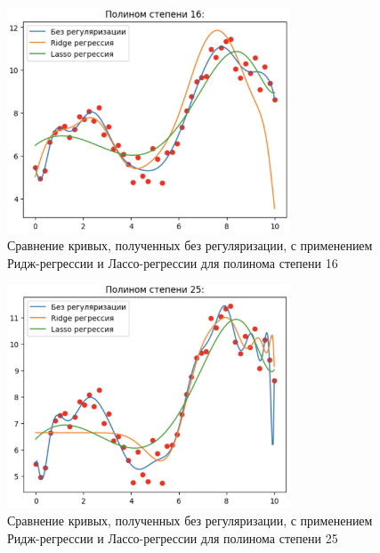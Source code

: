 \begin{figure}
	\begin{center}
		\includegraphics[width=0.75\textwidth]{images/7.png}
	\end{center}
	\caption{Сравнение кривых, полученных без регуляризации, с применением Ридж-регрессии и Лассо-регрессии для полинома степени 16}
	\label{img:7}
\end{figure}

\begin{figure}
	\begin{center}
		\includegraphics[width=0.75\textwidth]{images/8.png}
	\end{center}
	\caption{Сравнение кривых, полученных без регуляризации, с применением Ридж-регрессии и Лассо-регрессии для полинома степени 25}
	\label{img:8}
\end{figure}

\clearpage
